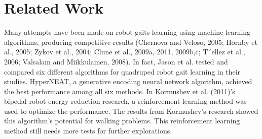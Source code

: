 \section{Related Work}

Many attempts have been made on robot gaits learning using machine
learning algorithms, producing competitive results  (Chernova and Veloso, 2005; Hornby et al., 2005;
Zykov et al., 2004; Clune et al., 2009a, 2011, 2009b,c; T´ellez et
al., 2006; Valsalam and Miikkulainen, 2008). In fact, Jason et
al. tested and compared six different algorithms for quadruped robot
gait learning in their studies. HyperNEAT, a generative encoding
neural network algorithm, achieved the best performance among all six
methods. In Kormushev et al. (2011)'s bipedal robot energy reduction
research, a reinforcement learning method was used to optimize the
performance. The results from Kormushev's research showed this
algorithm's potential for walking problems. This reinforcement
learning method still needs more tests for further explorations.
